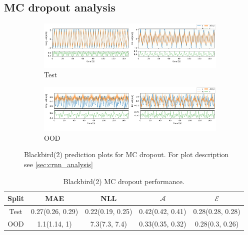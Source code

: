 \clearpage
\subsection{MC dropout analysis}

\begin{figure}[h]
  \centering
  
  \begin{subfigure}[b]{\textwidth}
    \includegraphics[width=\textwidth]{Experiments/figs/bb2_dropout_test.png}
    \caption{Test}
  \end{subfigure}
  
  \begin{subfigure}[b]{\textwidth}
    \includegraphics[width=\textwidth]{Experiments/figs/bb2_dropout_ood.png}
    \caption{OOD}
  \end{subfigure}
  
  \caption[Blackbird(2) prediction plots for MC dropout]{Blackbird(2) prediction plots for MC dropout. For plot description see \cref{sec:crnn_analysis}}
  \label{fig:bb2_dropout_run}
\end{figure}

\begin{table}[h]
\centering
    \begin{tabular}{c  c  c  c  c }  
        \toprule
        Split & MAE & NLL & $\mathcal{A}$ & $\mathcal{E}$\\
        \midrule
        Test & 0.27(0.26, 0.29) & 0.22(0.19, 0.25) & 0.42(0.42, 0.41) &  0.28(0.28, 0.28)\\
        OOD  &  1.1(1.14, 1) &  7.3(7.3, 7.4) & 0.33(0.35, 0.32)&  0.28(0.3, 0.26)\\
        \midrule
    \end{tabular}
    \caption{Blackbird(2) MC dropout performance.}
    \label{tbl:bb2_dropout}
\end{table}



